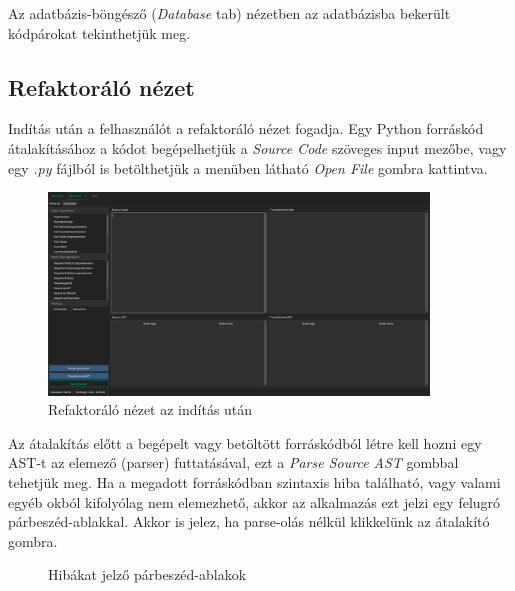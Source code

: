 Az adatbázis-böngésző (\emph{Database} tab) nézetben az adatbázisba bekerült kódpárokat tekinthetjük meg.

\subsection{Refaktoráló nézet}

Indítás után a felhasználót a refaktoráló nézet fogadja.
Egy Python forráskód átalakításához a kódot begépelhetjük a \emph{Source Code} szöveges input mezőbe,
vagy egy \emph{.py} fájlból is betölthetjük a menüben látható \emph{Open File} gombra kattintva.

\begin{figure}[H]
	\centering
	\includegraphics[width=0.9\textwidth]{images/screenshots/refactor_tab_1.png}
	\caption{Refaktoráló nézet az indítás után}
\end{figure}

Az átalakítás előtt a begépelt vagy betöltött forráskódból létre kell hozni egy AST-t
az elemező (parser) futtatásával,
ezt a \emph{Parse Source AST} gombbal tehetjük meg. Ha a megadott forráskódban szintaxis hiba található, 
vagy valami egyéb okból kifolyólag nem elemezhető, akkor az alkalmazás ezt jelzi egy felugró 
párbeszéd-ablakkal. Akkor is jelez, ha parse-olás nélkül klikkelünk az átalakító gombra.

\begin{figure}[H]
	\centering
	\hspace{5pt}
	\caption{Hibákat jelző párbeszéd-ablakok}
\end{figure}

